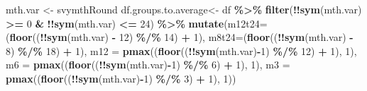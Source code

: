 \documentclass[
]{book}
\newenvironment{Shaded}{\begin{snugshade}}{\end{snugshade}}
\newcommand{\DataTypeTok}[1]{\textcolor[rgb]{0.13,0.29,0.53}{#1}}
\newcommand{\DecValTok}[1]{\textcolor[rgb]{0.00,0.00,0.81}{#1}}
\newcommand{\KeywordTok}[1]{\textcolor[rgb]{0.13,0.29,0.53}{\textbf{#1}}}
\newcommand{\NormalTok}[1]{#1}
\newcommand{\OperatorTok}[1]{\textcolor[rgb]{0.81,0.36,0.00}{\textbf{#1}}}
\newcommand{\StringTok}[1]{\textcolor[rgb]{0.31,0.60,0.02}{#1}}
\begin{document}
\begin{Shaded}
\begin{Highlighting}[]
\NormalTok{mth.var \textless{}{-}}\StringTok{ \textquotesingle{}svymthRound\textquotesingle{}}
\NormalTok{df.groups.to.average\textless{}{-}}\StringTok{ }\NormalTok{df }\OperatorTok{\%\textgreater{}\%}
\StringTok{        }\KeywordTok{filter}\NormalTok{(}\OperatorTok{!!}\KeywordTok{sym}\NormalTok{(mth.var) }\OperatorTok{\textgreater{}=}\StringTok{ }\DecValTok{0} \OperatorTok{\&}\StringTok{ }\OperatorTok{!!}\KeywordTok{sym}\NormalTok{(mth.var) }\OperatorTok{\textless{}=}\StringTok{ }\DecValTok{24}\NormalTok{)  }\OperatorTok{\%\textgreater{}\%}
\StringTok{        }\KeywordTok{mutate}\NormalTok{(}\DataTypeTok{m12t24=}\NormalTok{(}\KeywordTok{floor}\NormalTok{((}\OperatorTok{!!}\KeywordTok{sym}\NormalTok{(mth.var) }\OperatorTok{{-}}\StringTok{ }\DecValTok{12}\NormalTok{) }\OperatorTok{\%/\%}\StringTok{ }\DecValTok{14}\NormalTok{) }\OperatorTok{+}\StringTok{ }\DecValTok{1}\NormalTok{),}
               \DataTypeTok{m8t24=}\NormalTok{(}\KeywordTok{floor}\NormalTok{((}\OperatorTok{!!}\KeywordTok{sym}\NormalTok{(mth.var) }\OperatorTok{{-}}\StringTok{ }\DecValTok{8}\NormalTok{) }\OperatorTok{\%/\%}\StringTok{ }\DecValTok{18}\NormalTok{) }\OperatorTok{+}\StringTok{ }\DecValTok{1}\NormalTok{),}
               \DataTypeTok{m12 =} \KeywordTok{pmax}\NormalTok{((}\KeywordTok{floor}\NormalTok{((}\OperatorTok{!!}\KeywordTok{sym}\NormalTok{(mth.var)}\OperatorTok{{-}}\DecValTok{1}\NormalTok{) }\OperatorTok{\%/\%}\StringTok{ }\DecValTok{12}\NormalTok{) }\OperatorTok{+}\StringTok{ }\DecValTok{1}\NormalTok{), }\DecValTok{1}\NormalTok{),}
               \DataTypeTok{m6 =} \KeywordTok{pmax}\NormalTok{((}\KeywordTok{floor}\NormalTok{((}\OperatorTok{!!}\KeywordTok{sym}\NormalTok{(mth.var)}\OperatorTok{{-}}\DecValTok{1}\NormalTok{) }\OperatorTok{\%/\%}\StringTok{ }\DecValTok{6}\NormalTok{) }\OperatorTok{+}\StringTok{ }\DecValTok{1}\NormalTok{), }\DecValTok{1}\NormalTok{),}
               \DataTypeTok{m3 =} \KeywordTok{pmax}\NormalTok{((}\KeywordTok{floor}\NormalTok{((}\OperatorTok{!!}\KeywordTok{sym}\NormalTok{(mth.var)}\OperatorTok{{-}}\DecValTok{1}\NormalTok{) }\OperatorTok{\%/\%}\StringTok{ }\DecValTok{3}\NormalTok{) }\OperatorTok{+}\StringTok{ }\DecValTok{1}\NormalTok{), }\DecValTok{1}\NormalTok{))}
\end{Highlighting}
\end{Shaded}
\end{document}
